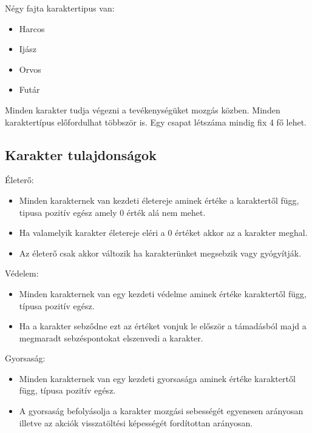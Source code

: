 
Négy fajta karaktertipus van:
\begin{itemize}
\item Harcos
\item Ijász
\item Orvos
\item Futár
\end{itemize}

Minden karakter tudja végezni a tevékenységüket mozgás közben.
Minden karaktertípus előfordulhat többször is.
Egy csapat létszáma mindig fix 4 fő lehet.

\newpage

\subsection{Karakter tulajdonságok}

Életerő:

\begin{itemize}
\item Minden karakternek van kezdeti életereje aminek értéke a karaktertől függ, tipusa pozitív egész amely 0 érték alá nem mehet.
\item Ha valamelyik karakter életereje eléri a 0 értéket akkor az a karakter meghal.
\item Az életerő csak akkor változik ha karakterünket megsebzik vagy gyógyítják.
\end{itemize}

Védelem:

\begin{itemize}
\item Minden karakternek van egy kezdeti védelme aminek értéke karaktertől függ, típusa pozitív egész.
\item Ha a karakter sebződne ezt az értéket vonjuk le először a támadásból majd a megmaradt sebzéspontokat elszenvedi a karakter.
\end{itemize}

\newpage

Gyorsaság:

\begin{itemize}
  \item Minden karakternek van egy kezdeti gyorsasága aminek értéke karaktertől függ, típusa pozitív egész.
  \item A gyorsaság befolyásolja a karakter mozgási sebességét egyenesen arányosan illetve az akciók visszatöltési képességét fordítottan arányosan.
\end{itemize}

